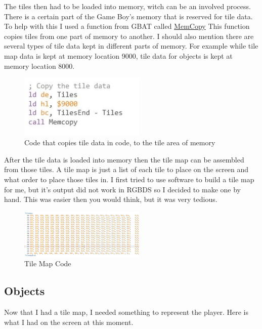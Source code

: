 \documentclass{article}
\begin{document}
The tiles then had to be loaded into memory, witch can be an involved process. There is a certain part of the Game Boy's memory that is reserved for tile data. To help with this I used a function from GBAT called \href{https://gbdev.io/gb-asm-tutorial/part2/functions.html}{MemCopy} This function copies tiles from one part of memory to another. I should also mention there are several types of tile data kept in different parts of memory. For example while tile map data is kept at memory location 9000, tile data for objects is kept at memory location 8000.

\begin{figure}[htp]
    \centering
    \includegraphics[width=6cm]{images/CopyTiles.JPG}
    \caption{Code that copies tile data in code, to the tile area of memory}
    \label{Calling memcopy}
\end{figure}

After the tile data is loaded into memory then the tile map can be assembled from those tiles. A tile map is just a list of each tile to place on the screen and what order to place those tiles in. I first tried to use software to build a tile map for me, but it's output did not work in RGBDS so I decided to make one by hand. This was easier then you would think, but it was very tedious.  

\begin{figure}[htp]
    \centering
    \includegraphics[width=6cm]{images/CorrectFirstTileMap.JPG}
    \caption{Tile Map Code}
    \label{Tile map code}
\end{figure}

\subsection{Objects}

Now that I had a tile map, I needed something to represent the player. Here is what I had on the screen at this moment.
\end{document}
